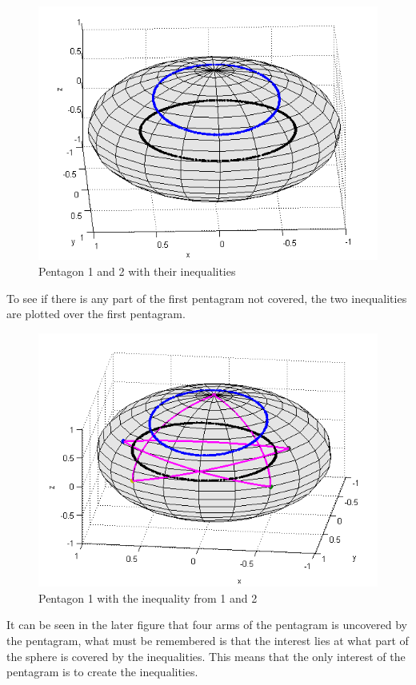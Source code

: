 \documentclass[
  utf8,%
  parskip,%
  largesmallcaps,intlimits,widermath,%
  sharecounter,nobreak,definition=marks,%
  noparts%
]{rtthesis}
\begin{document}
\begin{figure}[H]
\begin{center}
\includegraphics[scale=0.5]{ine12.png}
\caption{Pentagon 1 and 2 with their inequalities}
\end{center}
\end{figure}
To see if there is any part of the first pentagram not covered, the two inequalities are plotted over the first pentagram.
\begin{figure}[H]
\begin{center}
\includegraphics[scale=0.5]{penta1ine12.png}
\caption{Pentagon 1 with the inequality from 1 and 2}
\end{center}
\end{figure}
It can be seen in the later figure that four arms of the pentagram is uncovered by the pentagram, what must be remembered is that the interest lies at what part of the sphere is covered by the inequalities. This means that the only interest of the pentagram is to create the inequalities.
\end{document}
